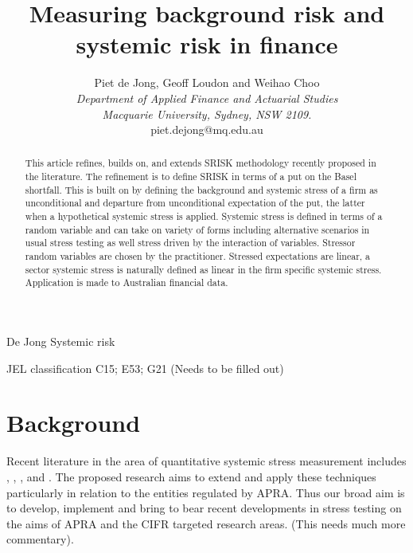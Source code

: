 \documentclass[authoryear]{elsarticle}
\begin{document}
\title{Measuring background risk and systemic risk in finance}
\author{Piet de Jong,  Geoff Loudon and Weihao Choo \\[4pt]
\textit{Department of Applied Finance and Actuarial Studies\\ Macquarie University, Sydney, NSW 2109.}
\\[2pt]
{piet.dejong@mq.edu.au}}

\markboth%
{De Jong}
{Systemic risk}

\begin{abstract}
This article refines, builds on, and extends  SRISK methodology recently proposed in the literature.  The refinement is to define SRISK in terms of a put on the Basel shortfall.   This  is built on by defining the background and systemic stress  of a firm as unconditional and departure from unconditional  expectation of the put, the latter when a hypothetical systemic stress is applied.  Systemic stress is defined in terms of a random variable and can take on variety of forms including alternative scenarios in usual stress testing as well stress driven by the interaction of variables.  Stressor random variables  are chosen by the practitioner.  Stressed expectations are linear, a sector systemic stress is naturally defined as linear in the firm specific systemic stress.      Application is made to Australian financial data. 
\end{abstract}

\maketitle

JEL classification
C15; E53; G21  (Needs to be filled out)

\section{Background}

Recent literature in the area of quantitative systemic stress measurement includes 
\cite{adrian2011covar},
\cite{acharya2012capital},
\cite{acharya2012measuring},
 \cite{brownlees2010volatility} and \cite{brownlees2015}.   The proposed research aims to extend and apply these techniques particularly in relation to the entities regulated by APRA.   Thus our  broad aim is to develop, implement and bring to bear recent developments in stress testing  on the aims of APRA and the CIFR targeted research areas.   (This needs much more commentary).
\end{document}
